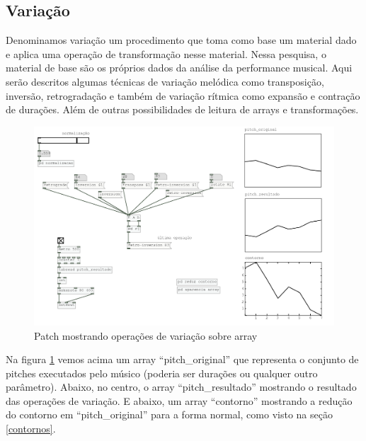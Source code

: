 \documentclass[draft]{ppgmus}
\begin{document}

\subsection{Variação}
\label{varia-contorno}


Denominamos variação um procedimento que toma como base um
material dado e aplica uma operação de transformação nesse material.
Nessa pesquisa, o material de base são os próprios dados da 
análise da performance musical.
Aqui serão descritos algumas técnicas de variação melódica como
transposição, inversão, retrogradação e também de variação rítmica
como expansão e contração de durações. Além de outras possibilidades
de leitura de arrays e transformações.

\begin{figure}
\includegraphics[scale=.6]{variacoes-contorno}
\caption{Patch mostrando operações de variação sobre array}
\label{variacoes-contorno}
\end{figure}  

Na figura \ref{variacoes-contorno} vemos acima um array ``pitch\_original'' que representa
o conjunto de pitches executados pelo músico (poderia ser durações ou qualquer
outro parâmetro). Abaixo, no centro, o array ``pitch\_resultado'' mostrando o resultado das  
operações de variação. E abaixo, um array ``contorno'' mostrando a redução do contorno em
``pitch\_original'' para a forma normal, como visto na seção \ref{contornos}.
\end{document}
